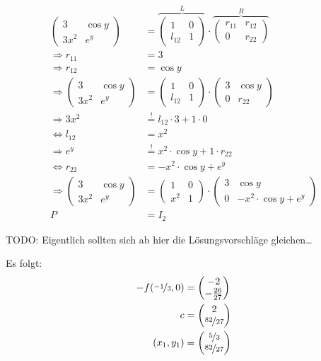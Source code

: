 \begin{align}
	\begin{pmatrix}
		3     & \cos y\\
		3 x^2 & e^y
	\end{pmatrix}
	&=
	\overbrace{\begin{pmatrix}
		1      & 0\\
		l_{12} & 1
	\end{pmatrix}}^L \cdot 
	\overbrace{\begin{pmatrix}
		r_{11} & r_{12}\\
		0      & r_{22}
	\end{pmatrix}}^R\\
	\Rightarrow r_{11} &= 3\\
	\Rightarrow r_{12} &= \cos y\\
	\Rightarrow \begin{pmatrix}
		3     & \cos y\\
		3 x^2 & e^y
	\end{pmatrix}
	&=
	\begin{pmatrix}
		1      & 0\\
		l_{12} & 1
	\end{pmatrix} \cdot 
	\begin{pmatrix}
		3 & \cos y\\
		0 & r_{22}
	\end{pmatrix}\\
	\Rightarrow 3x^2 &\stackrel{!}{=} l_{12} \cdot 3 + 1 \cdot 0\\
	\Leftrightarrow l_{12} &= x^2\\
	\Rightarrow e^y &\stackrel{!}{=} x^2 \cdot \cos y + 1 \cdot r_{22}\\
	\Leftrightarrow r_{22} &= -x^2 \cdot \cos y + e^y\\
	\Rightarrow \begin{pmatrix}
		3     & \cos y\\
		3 x^2 & e^y
	\end{pmatrix}
	&=
	\begin{pmatrix}
		1   & 0\\
		x^2 & 1
	\end{pmatrix} \cdot 
	\begin{pmatrix}
		3 & \cos y\\
		0 & -x^2 \cdot \cos y + e^y
	\end{pmatrix}\\
	P &= I_2
\end{align}

TODO: Eigentlich sollten sich ab hier die Lösungsvorschläge gleichen\dots

Es folgt:
\begin{align}
-f ( \nicefrac{-1}{3}, 0) &= \begin{pmatrix} -2\\ -\frac{26}{27}\end{pmatrix}\\
c &= \begin{pmatrix} 2\\ \nicefrac{82}{27} \end{pmatrix}\\ %
(x_1, y_1) &= \begin{pmatrix} \nicefrac{5}{3}\\ \nicefrac{82}{27}\end{pmatrix}
\end{align}

